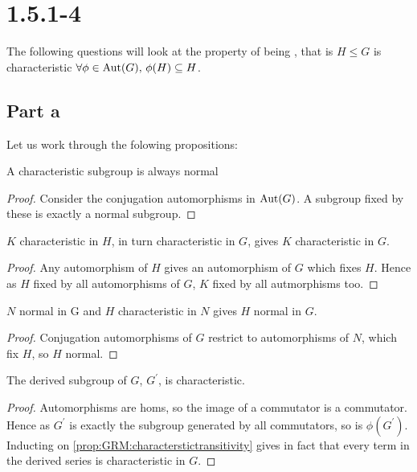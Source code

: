 \documentclass{article}
\begin{document}
\section{1.5.1-4}
The following questions will look at the property of being , that is $H \leq G$ is characteristic  $\forall \phi \in \operatorname{Aut}(G), \, \phi(H) \subseteq H$.
\subsection{Part a}
Let us work through the folowing propositions:
\begin{prop}[i]
A characteristic subgroup is always normal
\end{prop}
\begin{proof}
Consider the conjugation automorphisms in $\operatorname{Aut}(G)$. A subgroup fixed by these is exactly a normal subgroup. 
\end{proof}

\begin{prop}\label{prop:GRM:characterstictransitivity}
$K$ characteristic in $H$, in turn characteristic in $G$, gives $K$ characteristic in $G$. 
\end{prop}
\begin{proof}
Any automorphism of $H$ gives an automorphism of $G$ which fixes $H$. Hence as $H$ fixed by all automorphisms of $G$, $K$ fixed by all autmorphisms too. 
\end{proof}

\begin{prop}
$N$ normal in G and $H$ characteristic in $N$ gives $H$ normal in $G$.  
\end{prop}
\begin{proof}
Conjugation automorphisms of $G$ restrict to automorphisms of $N$, which fix $H$, so $H$ normal. 
\end{proof}

\begin{prop}
The derived subgroup of $G$, $G^\prime$, is characteristic. 
\end{prop}
\begin{proof}
Automorphisms are homs, so the image of a commutator is a commutator. Hence as $G^\prime$ is exactly the subgroup generated by all commutators, so is $\phi(G^\prime)$. Inducting on \ref{prop:GRM:characterstictransitivity} gives in fact that every term in the derived series is characteristic in $G$. 
\end{proof}
\end{document}
